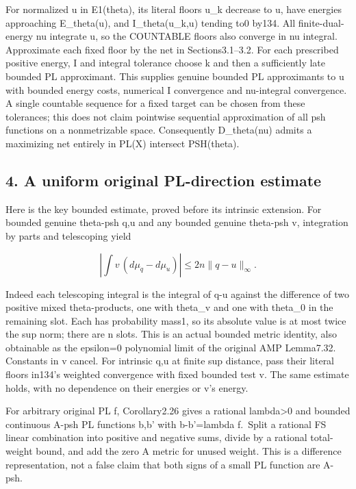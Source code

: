 \documentclass[
  10pt,
]{article}
\begin{document}
For normalized u in E1(theta), its literal floors u\_k decrease to u,
have energies approaching E\_theta(u), and I\_theta(u\_k,u) tending to0
by134. All finite-dual-energy nu integrate u, so the COUNTABLE floors
also converge in nu integral. Approximate each fixed floor by the net in
Sections3.1--3.2. For each prescribed positive energy, I and integral
tolerance choose k and then a sufficiently late bounded PL approximant.
This supplies genuine bounded PL approximants to u with bounded energy
costs, numerical I convergence and nu-integral convergence. A single
countable sequence for a fixed target can be chosen from these
tolerances; this does not claim pointwise sequential approximation of
all psh functions on a nonmetrizable space. Consequently D\_theta(nu)
admits a maximizing net entirely in PL(X) intersect PSH(theta).

\subsection{4. A uniform original PL-direction
estimate}\label{a-uniform-original-pl-direction-estimate}

Here is the key bounded estimate, proved before its intrinsic extension.
For bounded genuine theta-psh q,u and any bounded genuine theta-psh v,
integration by parts and telescoping yield

\[\left|\int v\,(d\mu_q-d\mu_u)\right|\leq2n\|q-u\|_\infty.\tag{3}\]

Indeed each telescoping integral is the integral of q-u against the
difference of two positive mixed theta-products, one with theta\_v and
one with theta\_0 in the remaining slot. Each has probability mass1, so
its absolute value is at most twice the sup norm; there are n slots.
This is an actual bounded metric identity, also obtainable as the
epsilon=0 polynomial limit of the original AMP Lemma7.32. Constants in v
cancel. For intrinsic q,u at finite sup distance, pass their literal
floors in134's weighted convergence with fixed bounded test v. The same
estimate holds, with no dependence on their energies or v's energy.

For arbitrary original PL f, Corollary2.26 gives a rational
lambda\textgreater0 and bounded continuous A-psh PL functions b,b' with
b-b'=lambda f.~Split a rational FS linear combination into positive and
negative sums, divide by a rational total-weight bound, and add the zero
A metric for unused weight. This is a difference representation, not a
false claim that both signs of a small PL function are A-psh.
\end{document}
